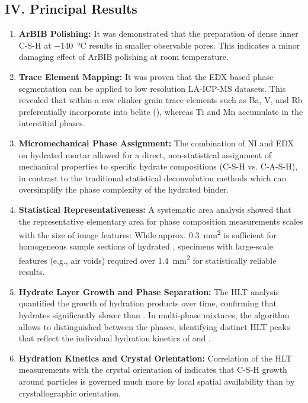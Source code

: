 \documentclass[11pt, a4paper]{article}
\begin{document}
\subsection*{IV. Principal Results}

\begin{enumerate}[label=\textbf{\arabic*.}, leftmargin=1.5cm, labelsep=0.5cm, itemsep=0.5em, resume]
    \item \textbf{ArBIB Polishing:} It was demonstrated that the preparation of dense inner C-S-H at \qty{-140}{\celsius} results in smaller observable pores.
    This indicates a minor damaging effect of ArBIB polishing at room temperature.
    \item \textbf{Trace Element Mapping:} It was proven that the EDX based phase segmentation can be applied to low resolution LA-ICP-MS datasets. This revealed that within a raw clinker grain trace elements such as Ba, V, and Rb preferentially incorporate into belite (), whereas Ti and Mn accumulate in the interstitial phases.
    \item \textbf{Micromechanical Phase Assignment:} The combination of NI and EDX on hydrated mortar allowed for a direct, non-statistical assignment of mechanical properties to specific hydrate compositions (C-S-H vs. C-A-S-H), in contrast to the traditional statistical deconvolution methods which can oversimplify the phase complexity of the hydrated binder.
    \newpage
    \item \textbf{Statistical Representativeness:} A systematic area analysis showed that the representative elementary area for phase composition measurements scales with the size of image features: While approx. \qty{0.3}{\milli\meter\squared} is sufficient for homogeneous sample sections of hydrated , specimens with large-scale features (e.g., air voids) required over \qty{1.4}{\milli\meter\squared} for statistically reliable results.
    \item \textbf{Hydrate Layer Growth and Phase Separation:} The HLT analysis quantified the growth of hydration products over time, confirming that  hydrates significantly slower than .
    In multi-phase mixtures, the algorithm allows to distinguished between the phases, identifying distinct HLT peaks that reflect the individual hydration kinetics of  and .
    \item \textbf{Hydration Kinetics and Crystal Orientation:} Correlation of the HLT measurements with the crystal orientation of  indicates that C-S-H growth around  particles is governed much more by local spatial availability than by crystallographic orientation.

\end{enumerate}
\end{document}
